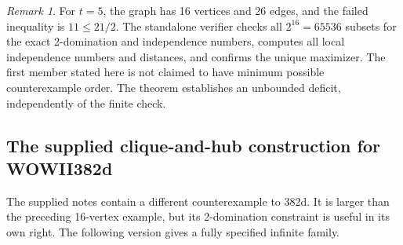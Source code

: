 \documentclass[11pt,a4paper]{article}
\theoremstyle{remark}
\newtheorem{remark}[theorem]{Remark}
\begin{document}
\begin{remark}
For $t=5$, the graph has 16 vertices and 26 edges, and the failed
inequality is $11\le21/2$. The standalone verifier checks all
$2^{16}=65536$ subsets for the exact 2-domination and independence
numbers, computes all local independence numbers and distances, and
confirms the unique maximizer. The first member stated here is not
claimed to have minimum possible counterexample order. The theorem
establishes an unbounded deficit, independently of the finite check.
\end{remark}


\subsection{The supplied clique-and-hub construction for WOWII382d}
\label{r7:382d}

The supplied notes contain a different counterexample to 382d. It is
larger than the preceding 16-vertex example, but its 2-domination
constraint is useful in its own right. The following version gives a
fully specified infinite family.
\end{document}
